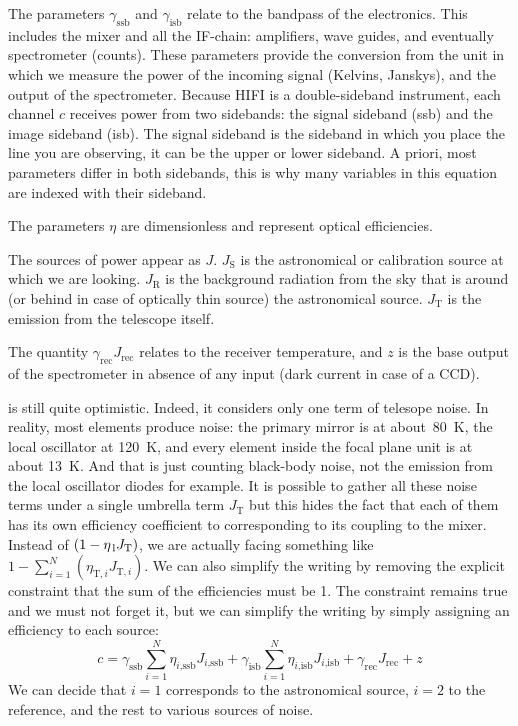The parameters $\gamma_\text{ssb}$ and $\gamma_\text{isb}$ relate to the bandpass of the electronics.
This includes the mixer and all the IF-chain: amplifiers, wave guides, and eventually spectrometer (counts).
These parameters provide the conversion from the unit in which we measure the power of the incoming signal (Kelvins, Janskys), and the output of the spectrometer.
Because HIFI is a double-sideband instrument, each channel $c$ receives power from two sidebands: the signal sideband (ssb) and the image sideband (isb).
The signal sideband is the sideband in which you place the line you are observing, it can be the upper or lower sideband.
A priori, most parameters differ in both sidebands, this is why many variables in this equation are indexed with their sideband.

The parameters $\eta$ are dimensionless and represent optical efficiencies.

The sources of power appear as $J$.
$J_\text{S}$ is the astronomical or calibration source at which we are looking.
$J_\text{R}$ is the background radiation from the sky that is around (or behind in case of optically thin source) the astronomical source.
$J_\text{T}$ is the emission from the telescope itself.

The quantity $\gamma_\text{rec} J_\text{rec}$ relates to the receiver temperature, and $z$ is the base output of the spectrometer in absence of any input (dark current in case of a CCD).

 is still quite optimistic.
Indeed, it considers only one term of telesope noise.
In reality, most elements produce noise: the primary mirror is at about~\SI{80}{\kelvin}, the local oscillator at \SI{120}{\kelvin}, and every element inside the focal plane unit is at about \SI{13}{\kelvin}.
And that is just counting black-body noise, not the emission from the local oscillator diodes for example.
It is possible to gather all these noise terms under a single umbrella term $J_\text{T}$ but this hides the fact that each of them has its own efficiency coefficient to corresponding to its coupling to the mixer.
Instead of $(1-\eta_\text{\,l} J_\text{T})$, we are actually facing something like
$1 - \sum_{i=1}^N (\eta_{\text{T}, i} J_{\text{T}, i})$.
We can also simplify the writing by removing the explicit constraint that the sum of the efficiencies must be 1.
The constraint remains true and we must not forget it, but we can simplify the writing by simply assigning an efficiency to each source:
\begin{equation}
    c =
    \gamma_\text{ssb}
    \sum_{i=1}^N \eta_{i\text{,ssb}} J_{i\text{,ssb}}
    +
    \gamma_\text{isb}
    \sum_{i=1}^N \eta_{i\text{,isb}} J_{i\text{,isb}}
    + \gamma_\text{rec} J_\text{rec} + z
\end{equation}
We can decide that $i=1$ corresponds to the astronomical source, $i=2$ to the reference, and the rest to various sources of noise.

